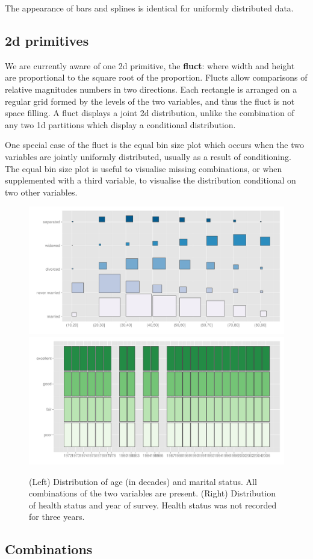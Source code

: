 \documentclass[letterpaper,oneside]{scrartcl}
\begin{document}
The appearance of bars and splines is identical for uniformly distributed data.

\subsection{2d primitives}
\label{sub:part-2d}

We are currently aware of one 2d primitive, the {\bf fluct}: where width and height are proportional to the square root of the proportion. Flucts allow comparisons of relative magnitudes numbers in two directions. Each rectangle is arranged on a regular grid formed by the levels of the two variables, and thus the fluct is not space filling. A fluct displays a joint 2d distribution, unlike the combination of any two 1d partitions which display a conditional distribution.

One special case of the fluct is the equal bin size plot which occurs when the two variables are jointly uniformly distributed, usually as a result of conditioning. The equal bin size plot is useful to visualise missing combinations, or when supplemented with a third variable, to visualise the distribution conditional on two other variables.

\begin{figure}[htbp]
  \centering
    \includegraphics[width=0.5\linewidth]{part-fluct}%
    \includegraphics[width=0.5\linewidth]{part-fluct-cond}
  \caption{(Left) Distribution of age (in decades) and marital status.  All combinations of the two variables are present. (Right) Distribution of health status and year of survey. Health status was not recorded for three years.}
  \label{fig:fluct}
\end{figure}

\subsection{Combinations}
\label{sub:part-nd}
\end{document}
